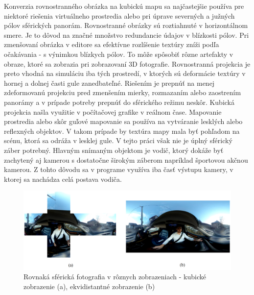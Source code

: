 \documentclass[slovak,master,dept460,male,cpp,cpdeclaration]{diploma}
\begin{document}
Konverzia rovnostranného obrázka na kubickú mapu sa najčastejšie používa pre niektoré riešenia virtuálneho prostredia alebo pri úprave severných a južných pólov sférických panorám.
Rovnostranné obrázky sú roztiahnuté v horizontálnom smere. Je to dôvod na značné množstvo redundancie údajov v blízkosti pólov. Pri zmenšovaní obrázka v editore sa efektívne rozlíšenie textúry zníži podľa očakávania - s výnimkou blízkych pólov. To môže spôsobiť rôzne artefakty v obraze, ktoré sa zobrazia pri zobrazovaní 3D fotografie. Rovnostranná projekcia je preto vhodná na simuláciu iba tých prostredí, v ktorých sú deformácie textúry v hornej a dolnej časti gule zanedbateľné. Riešením je prepnúť na menej zdeformovanú projekciu pred zmenšením mierky, rozmazaním alebo zaostrením panorámy a v prípade potreby prepnúť do sférického režimu neskôr. Kubická projekcia našla využitie v počítačovej grafike v reálnom čase. Mapovanie prostredia alebo skôr guľové mapovanie sa používa na vytváranie lesklých alebo reflexných objektov. V takom prípade by textúra mapy mala byť pohľadom na scénu, ktorá sa odráža v lesklej gule. V tejto práci však nie je  úplný sférický záber potrebný. Hlavným snímaným objektom je vodič, ktorý dokáže byť zachytený aj kamerou s dostatočne širokým záberom napríklad športovou akčnou kamerou. Z tohto dôvodu sa v programe využíva iba časť výstupu kamery, v ktorej sa nachádza celá postava vodiča.

\begin{figure}[H]
	\centering
	\includegraphics[width=1\textwidth]{Figures/cubemapVsEcti.png}
	\caption{Rovnaká sférická fotografia v rôznych zobrazeniach  - kubické zobrazenie (a), ekvidistantné zobrazenie (b)}
	\label{fig:sphereFormats}
\end{figure}


\newpage
\end{document}

